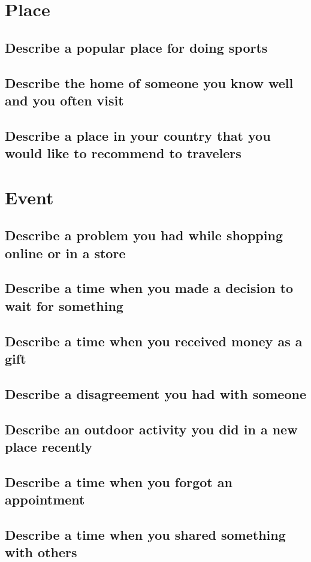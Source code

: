 \documentclass[conference]{IEEEtran}
\begin{document}
\section{Place}
\subsection{Describe a popular place for doing sports}
\subsection{Describe the home of someone you know well and you often visit}
\subsection{Describe a place in your country that you would like to recommend to
travelers}

\section{Event}
\subsection{Describe a problem you had while shopping online or in a store}
\subsection{Describe a time when you made a decision to wait for something}
\subsection{Describe a time when you received money as a gift}
\subsection{Describe a disagreement you had with someone}
\subsection{Describe an outdoor activity you did in a new place recently}
\subsection{Describe a time when you forgot an appointment}
\subsection{Describe a time when you shared something with others}
\end{document}
